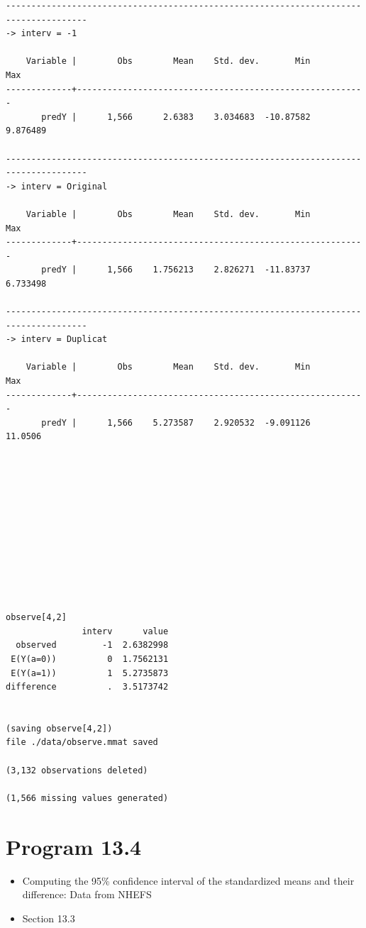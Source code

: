 \documentclass[
  10pt,
  a4paper,
]{book}
\providecommand{\tightlist}{%
  \setlength{\itemsep}{0pt}\setlength{\parskip}{0pt}}
\begin{document}
\begin{verbatim}
--------------------------------------------------------------------------------------
-> interv = -1

    Variable |        Obs        Mean    Std. dev.       Min        Max
-------------+---------------------------------------------------------
       predY |      1,566      2.6383    3.034683  -10.87582   9.876489

--------------------------------------------------------------------------------------
-> interv = Original

    Variable |        Obs        Mean    Std. dev.       Min        Max
-------------+---------------------------------------------------------
       predY |      1,566    1.756213    2.826271  -11.83737   6.733498

--------------------------------------------------------------------------------------
-> interv = Duplicat

    Variable |        Obs        Mean    Std. dev.       Min        Max
-------------+---------------------------------------------------------
       predY |      1,566    5.273587    2.920532  -9.091126    11.0506












observe[4,2]
               interv      value
  observed         -1  2.6382998
 E(Y(a=0))          0  1.7562131
 E(Y(a=1))          1  5.2735873
difference          .  3.5173742


(saving observe[4,2])
file ./data/observe.mmat saved

(3,132 observations deleted)

(1,566 missing values generated)
\end{verbatim}

\section{Program 13.4}\label{program-13.4-1}

\begin{itemize}
\tightlist
\item
  Computing the 95\% confidence interval of the standardized means and their difference: Data from NHEFS
\item
  Section 13.3
\end{itemize}
\end{document}
